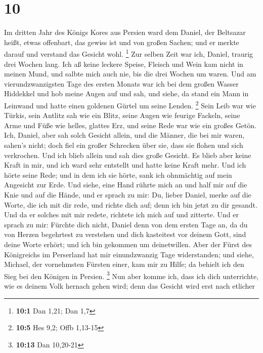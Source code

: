 \hypertarget{section-5}{%
\section{10}\label{section-5}}

 Im dritten Jahr des Königs Kores aus Persien ward dem
Daniel, der Beltsazar heißt, etwas offenbart, das gewiss ist und von
großen Sachen; und er merkte darauf und verstand das Gesicht wohl.
\footnote{\textbf{10:1} Dan 1,21; Dan 1,7}  Zur selben
Zeit war ich, Daniel, traurig drei Wochen lang.  Ich aß
keine leckere Speise, Fleisch und Wein kam nicht in meinen Mund, und
salbte mich auch nie, bis die drei Wochen um waren.  Und
am vierundzwanzigsten Tage des ersten Monats war ich bei dem großen
Wasser Hiddekkel  und hob meine Augen auf und sah, und
siehe, da stand ein Mann in Leinwand und hatte einen goldenen Gürtel um
seine Lenden. \footnote{\textbf{10:5} Hes 9,2; Offb 1,13-15}
 Sein Leib war wie Türkis, sein Antlitz sah wie ein Blitz,
seine Augen wie feurige Fackeln, seine Arme und Füße wie helles, glattes
Erz, und seine Rede war wie ein großes Getön.  Ich,
Daniel, aber sah solch Gesicht allein, und die Männer, die bei mir
waren, sahen's nicht; doch fiel ein großer Schrecken über sie, dass sie
flohen und sich verkrochen.  Und ich blieb allein und sah
dies große Gesicht. Es blieb aber keine Kraft in mir, und ich ward sehr
entstellt und hatte keine Kraft mehr.  Und ich hörte seine
Rede; und in dem ich sie hörte, sank ich ohnmächtig auf mein Angesicht
zur Erde.  Und siehe, eine Hand rührte mich an und half
mir auf die Knie und auf die Hände,  und er sprach zu
mir: Du, lieber Daniel, merke auf die Worte, die ich mit dir rede, und
richte dich auf; denn ich bin jetzt zu dir gesandt. Und da er solches
mit mir redete, richtete ich mich auf und zitterte.  Und
er sprach zu mir: Fürchte dich nicht, Daniel denn von dem ersten Tage
an, da du von Herzen begehrtest zu verstehen und dich kasteitest vor
deinem Gott, sind deine Worte erhört; und ich bin gekommen um
deinetwillen.  Aber der Fürst des Königreichs im
Perserland hat mir einundzwanzig Tage widerstanden; und siehe, Michael,
der vornehmsten Fürsten einer, kam mir zu Hilfe; da behielt ich den Sieg
bei den Königen in Persien. \footnote{\textbf{10:13} Dan 10,20-21}
 Nun aber komme ich, dass ich dich unterrichte, wie es
deinem Volk hernach gehen wird; denn das Gesicht wird erst nach etlicher
